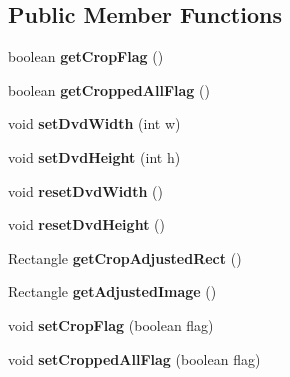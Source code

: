 \subsection*{Public Member Functions}
\begin{DoxyCompactItemize}
\item 
\hypertarget{class_image_pane_a255cfe2fc340af5859f8862e56fe54be}{boolean {\bfseries get\-Crop\-Flag} ()}\label{class_image_pane_a255cfe2fc340af5859f8862e56fe54be}

\item 
\hypertarget{class_image_pane_a5c2576cd6c9aa7748e3cb9733a03f29c}{boolean {\bfseries get\-Cropped\-All\-Flag} ()}\label{class_image_pane_a5c2576cd6c9aa7748e3cb9733a03f29c}

\item 
\hypertarget{class_image_pane_ade727efbec66dddd425374b7c6a207ba}{void {\bfseries set\-Dvd\-Width} (int w)}\label{class_image_pane_ade727efbec66dddd425374b7c6a207ba}

\item 
\hypertarget{class_image_pane_a201e6feac95148c9734a530b98d9e9a5}{void {\bfseries set\-Dvd\-Height} (int h)}\label{class_image_pane_a201e6feac95148c9734a530b98d9e9a5}

\item 
\hypertarget{class_image_pane_a198d4686ed7b1db5d87dd2982f606bd1}{void {\bfseries reset\-Dvd\-Width} ()}\label{class_image_pane_a198d4686ed7b1db5d87dd2982f606bd1}

\item 
\hypertarget{class_image_pane_a76a8b0ef65f6f0c0461ee6be1b68f619}{void {\bfseries reset\-Dvd\-Height} ()}\label{class_image_pane_a76a8b0ef65f6f0c0461ee6be1b68f619}

\item 
\hypertarget{class_image_pane_a3928985ebb14e16410e38e252dbefd05}{Rectangle {\bfseries get\-Crop\-Adjusted\-Rect} ()}\label{class_image_pane_a3928985ebb14e16410e38e252dbefd05}

\item 
\hypertarget{class_image_pane_af0d11a52742ce1884eedbfb6d3e3e97f}{Rectangle {\bfseries get\-Adjusted\-Image} ()}\label{class_image_pane_af0d11a52742ce1884eedbfb6d3e3e97f}

\item 
\hypertarget{class_image_pane_a396110fc43247e26bb0a61aad98e2244}{void {\bfseries set\-Crop\-Flag} (boolean flag)}\label{class_image_pane_a396110fc43247e26bb0a61aad98e2244}

\item 
\hypertarget{class_image_pane_a8ae8755a8ac3800eed97d9d5ffb78e0f}{void {\bfseries set\-Cropped\-All\-Flag} (boolean flag)}\label{class_image_pane_a8ae8755a8ac3800eed97d9d5ffb78e0f}


\end{DoxyCompactItemize}
